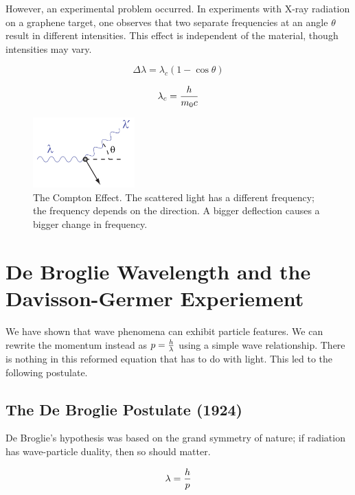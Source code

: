 \documentclass[english, 11pt]{article}
\begin{document}
       However, an experimental problem occurred. In experiments with X-ray radiation on a graphene target, one observes that two separate frequencies at an angle $\theta$ result in different intensities. This effect is independent of the material, though intensities may vary.
       \newline

       \begin{defn}\label{compton_shift}
         \[ \Delta \lambda = \lambda_c (1 - \cos \theta) \]
       \end{defn}

       \begin{defn}\label{compton_wavelength}
         \[ \lambda_c = \frac{h}{m_0c} \]
       \end{defn}

       \begin{figure}[t]
         \centering
           \includegraphics[width=0.35\textwidth]{compton_scattering.png}
         \caption{The Compton Effect. The scattered light has a different frequency; the frequency depends on the direction. A bigger deflection causes a bigger change in frequency.}
       \end{figure}

   \section{De Broglie Wavelength and the Davisson-Germer Experiement}

     We have shown that wave phenomena can exhibit particle features. We can rewrite the momentum instead as $p = \frac{h}{\lambda}$ using a simple wave relationship. There is nothing in this reformed equation that has to do with light. This led to the following postulate.

     \subsection{The De Broglie Postulate (1924)}
       De Broglie's hypothesis was based on the grand symmetry of nature; if radiation has wave-particle duality, then so should matter.
       \begin{defn}\label{de_broglie_relation}
         \[ \lambda = \frac{h}{p} \]
       \end{defn}
\end{document}
